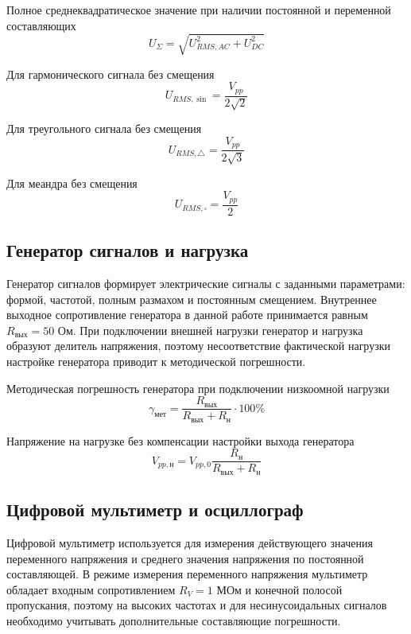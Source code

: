 \documentclass[12pt,a4paper]{article}
\begin{document}
Полное среднеквадратическое значение при наличии постоянной и переменной составляющих
\begin{equation}
U_{\Sigma}=\sqrt{U_{RMS,AC}^2+U_{DC}^2}
\label{eq:utotal}
\end{equation}

Для гармонического сигнала без смещения
\begin{equation*}
U_{RMS,\sin}=\frac{V_{pp}}{2\sqrt2}
\end{equation*}

Для треугольного сигнала без смещения
\begin{equation*}
U_{RMS,\triangle}=\frac{V_{pp}}{2\sqrt3}
\end{equation*}

Для меандра без смещения
\begin{equation*}
U_{RMS,\square}=\frac{V_{pp}}{2}
\end{equation*}

\subsection{Генератор сигналов и нагрузка}

Генератор сигналов формирует электрические сигналы с заданными параметрами: формой, частотой, полным размахом и постоянным смещением. Внутреннее выходное сопротивление генератора в данной работе принимается равным $R_{\text{вых}}=50$ Ом. При подключении внешней нагрузки генератор и нагрузка образуют делитель напряжения, поэтому несоответствие фактической нагрузки настройке генератора приводит к методической погрешности.

Методическая погрешность генератора при подключении низкоомной нагрузки
\begin{equation}
\gamma_{\text{мет}}=\frac{R_{\text{вых}}}{R_{\text{вых}}+R_{\text{н}}}\cdot100\%
\label{eq:gen-method}
\end{equation}

Напряжение на нагрузке без компенсации настройки выхода генератора
\begin{equation}
V_{pp,\text{н}}=V_{pp,0}\frac{R_{\text{н}}}{R_{\text{вых}}+R_{\text{н}}}
\label{eq:gen-load}
\end{equation}

\subsection{Цифровой мультиметр и осциллограф}

Цифровой мультиметр используется для измерения действующего значения переменного напряжения и среднего значения напряжения по постоянной составляющей. В режиме измерения переменного напряжения мультиметр обладает входным сопротивлением $R_V=1$ МОм и конечной полосой пропускания, поэтому на высоких частотах и для несинусоидальных сигналов необходимо учитывать дополнительные составляющие погрешности.
\end{document}
